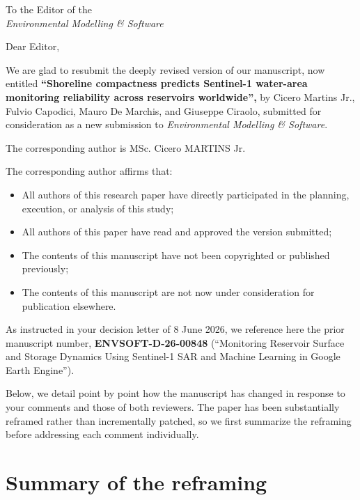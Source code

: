 \documentclass[11pt]{article}
\begin{document}
\thispagestyle{fancy}

\vspace{0.3cm}
\begin{flushright}
To the Editor of the\\
\textit{Environmental Modelling \& Software}
\end{flushright}

\vspace{0.5cm}
Dear Editor,

\vspace{0.2cm}
We are glad to resubmit the deeply revised version of our manuscript,
now entitled \textbf{``Shoreline compactness predicts
Sentinel-1 water-area monitoring reliability across reservoirs worldwide'',}
by Cicero Martins Jr., Fulvio Capodici, Mauro De Marchis, and Giuseppe
Ciraolo, submitted for consideration as a new submission to
\textit{Environmental Modelling \& Software}.

The corresponding author is MSc. Cicero MARTINS Jr.

The corresponding author affirms that:

\begin{itemize}[noitemsep, leftmargin=1.2em]
\item{All authors of this research paper have directly participated in the planning, execution, or analysis of this study;}
\item{All authors of this paper have read and approved the version submitted;}
\item{The contents of this manuscript have not been copyrighted or published previously;}
\item{The contents of this manuscript are not now under consideration for publication elsewhere.}
\end{itemize}

As instructed in your decision letter of 8 June 2026, we reference here the
prior manuscript number, \textbf{ENVSOFT-D-26-00848} (``Monitoring Reservoir
Surface and Storage Dynamics Using Sentinel-1 SAR and Machine Learning in
Google Earth Engine'').

Below, we detail point by point how the manuscript
has changed in response to your comments and those of both reviewers. The
paper has been substantially reframed rather than incrementally patched, so we
first summarize the reframing before addressing each comment individually.

\section*{Summary of the reframing}
\end{document}
